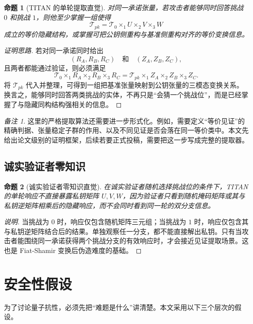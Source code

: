 \documentclass[12pt,a4paper]{article}
\newtheorem{proposition}{命题}[section]
\theoremstyle{remark}
\newtheorem{remark}{备注}[section]
\begin{document}
\begin{proposition}[TITAN 的单轮提取直觉]
对同一承诺张量，若攻击者能够同时回答挑战 $0$ 和挑战 $1$，则他至少掌握一组使得
\[
\mathcal{T}_{pk}=\mathcal{T}_0\times_1 U\times_2 V\times_3 W
\]
成立的等价隐藏结构，或掌握可把公钥侧重构与基准侧重构对齐的等价变换信息。
\end{proposition}

\begin{proof}[证明思路]
若对同一承诺同时给出
\[
(R_A,R_B,R_C)
\quad\text{和}\quad
(Z_A,Z_B,Z_C),
\]
且两者都能通过验证，则必须满足
\[
\mathcal{T}_0\times_1 R_A\times_2 R_B\times_3 R_C
=
\mathcal{T}_{pk}\times_1 Z_A\times_2 Z_B\times_3 Z_C.
\]
将 $\mathcal{T}_{pk}$ 代入并整理，可得到一组把基准张量映射到公钥张量的三模态变换关系。换言之，能够同时回答两类挑战的实体，不再只是“会猜一个挑战位”，而是已经掌握了与隐藏同构结构强相关的信息。
\end{proof}

\begin{remark}
这里的严格提取算法还需要进一步形式化。例如，需要定义“等价见证”的精确判据、张量稳定子群的作用、以及不同见证是否会落在同一等价类中。本文先给出论文级别的证明框架，后续若要正式投稿，需要把这一步写成完整的提取器。
\end{remark}

\subsection{诚实验证者零知识}

\begin{proposition}[诚实验证者零知识直觉]
在诚实验证者随机选择挑战位的条件下，TITAN 的单轮响应不直接暴露私钥矩阵 $U,V,W$，因为验证者只看到随机掩码矩阵或其与私钥逆矩阵相乘后的隐藏响应，而不会同时看到同一轮的双分支信息。
\end{proposition}

\begin{proof}[说明]
当挑战为 $0$ 时，响应仅包含随机矩阵三元组；当挑战为 $1$ 时，响应仅包含其与私钥逆矩阵结合后的结果。单独观察任一分支，都不能直接解出私钥。只有当攻击者能围绕同一承诺获得两个挑战分支的有效响应时，才会接近见证提取场景。这也是 Fiat-Shamir 变换后伪造难度的基础。
\end{proof}

\section{安全性假设}

为了讨论量子抗性，必须先把“难题是什么”讲清楚。本文采用以下三个层次的假设。
\end{document}
